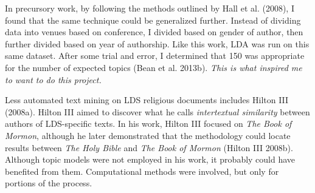 In precursory work, by following the methods outlined by Hall et al. (2008), I found that the same technique could be generalized further. Instead of dividing data into venues based on conference, I divided based on gender of author, then further divided based on year of authorship. Like this work, LDA was run on this same dataset. After some trial and error, I determined that 150 was appropriate for the number of expected topics (Bean et al. 2013b). \textit{This is what inspired me to want to do this project.}

Less automated text mining on LDS religious documents includes Hilton III (2008a).  %
Hilton III aimed to discover what he calls \emph{intertextual similarity} between authors of LDS-specific texts. In his work, Hilton III focused on \emph{The Book of Mormon}, although he later demonstrated that the methodology could locate results between \emph{The Holy Bible} and \emph{The Book of Mormon} %
(Hilton III 2008b). Although topic models were not employed in his work, it probably could have benefited from them. Computational methods were involved, but only for portions of the process.